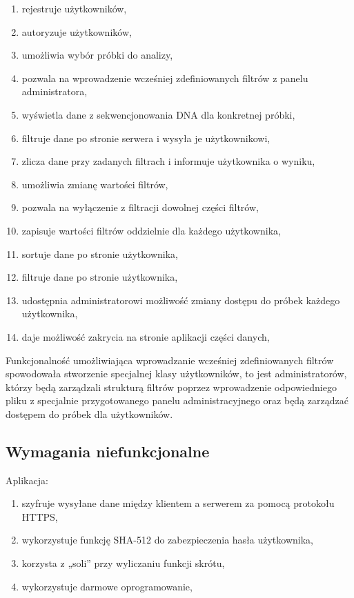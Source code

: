 \documentclass[a4paper,12pt,twoside]{article}
\begin{document}
 \begin{enumerate}[1)]
 \item rejestruje użytkowników,
 \item autoryzuje użytkowników,
 \item umożliwia wybór próbki do analizy,
 \item pozwala na wprowadzenie wcześniej zdefiniowanych filtrów z panelu administratora,
 \item wyświetla dane z sekwencjonowania DNA dla konkretnej próbki,
 \item filtruje dane po stronie serwera i wysyła je użytkownikowi,
 \item zlicza dane przy zadanych filtrach i informuje użytkownika o wyniku,
 \item umożliwia zmianę wartości filtrów,
 \item pozwala na wyłączenie z filtracji dowolnej części filtrów,
 \item zapisuje wartości filtrów oddzielnie dla każdego użytkownika,
 \item sortuje dane po stronie użytkownika,
 \item filtruje dane po stronie użytkownika,
 \item udostępnia administratorowi możliwość zmiany dostępu do próbek 
 każdego użytkownika,
 \item daje możliwość zakrycia na stronie aplikacji części danych,	
 \end{enumerate}
 
\newpage

Funkcjonalność umożliwiająca wprowadzanie wcześniej zdefiniowanych filtrów spowodowała stworzenie
specjalnej klasy użytkowników, to jest administratorów, którzy będą zarządzali strukturą filtrów poprzez wprowadzenie odpowiedniego pliku z specjalnie przygotowanego panelu administracyjnego
oraz będą zarządzać dostępem do próbek dla użytkowników.

\subsection{Wymagania niefunkcjonalne}
Aplikacja:
 \begin{enumerate}[1)]
  \item szyfruje wysyłane dane między klientem a serwerem za pomocą protokołu HTTPS,
  \item wykorzystuje funkcję SHA-512\cite{sha} do zabezpieczenia hasła użytkownika,
  \item korzysta z „soli” przy wyliczaniu funkcji skrótu,
  \item wykorzystuje darmowe oprogramowanie,
 \end{enumerate}
\end{document}
